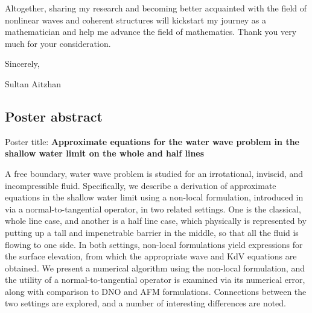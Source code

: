 \documentclass[10pt,reqno,oneside,a4paper]{article}
\begin{document}
Altogether, sharing my research and becoming better acquainted with the field of nonlinear waves and coherent structures will kickstart my journey as a mathematician and help me advance the field of mathematics. Thank you very much for your consideration.

Sincerely,

Sultan Aitzhan

\subsection*{Poster abstract}
Poster title: \textbf{Approximate equations for the water wave problem in the shallow water limit on the whole and half lines}

A free boundary, water wave problem is studied for an irrotational, inviscid, and incompressible fluid. Specifically, we describe a derivation of approximate equations in the shallow water limit using a non-local formulation, introduced in \cite{KV2013} via a normal-to-tangential operator, in two related settings. One is the classical, whole line case, and another is a half line case, which physically is represented by putting up a tall and impenetrable barrier in the middle, so that all the fluid is flowing to one side. In both settings, non-local formulations yield expressions for the surface elevation, from which the appropriate wave and KdV equations are obtained. We present a numerical algorithm using the non-local formulation, and the utility of a normal-to-tangential operator is examined via its numerical error, along with comparison to DNO \cite{DNO} and AFM \cite{AFM} formulations. Connections between the two settings are explored, and a number of interesting differences are noted.


{\small}
\end{document}
